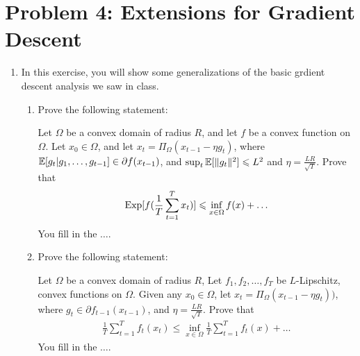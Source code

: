 \documentclass[12pt]{article}
\begin{document}
\section*{Problem 4: Extensions for Gradient Descent}
\begin{enumerate}
\item In this exercise, you will show some generalizations of the basic grdient
descent analysis we saw in class.

\begin{enumerate}
\item Prove the following statement:
\begin{proposition*} Let $\Omega$ be a convex domain of radius $R$, and let $f$ be a convex function on $\Omega$. Let $x_0 \in \Omega$, and let $x_{t} = \Pi_{\Omega}(x_{t-1} - \eta g_t )$, where $\operatorname*{\mathbb{E}}[g_t | g_1,\dots,g_{t-1}] \in \partial f(x_{t-1})$, and $\sup_{t} \operatorname*{\mathbb{E}}[\|g_t\|^2] \leqslant L^2$ and $\eta = \frac{LR}{\sqrt{T}}$.  Prove that 
\begin{eqnarray}
 \mathrm{Exp}[f(\frac{1}{T}\sum_{t=1}^T x_t)] \leqslant \inf_{x \in \Omega} f(x) + \dots
\end{eqnarray}
You fill in the $\dots$.
\end{proposition*}
\item Prove the following statement:
\begin{proposition*}  Let $\Omega$ be a convex domain of radius $R$, Let $f_1,f_2,\dots,f_T$ be $L$-Lipschitz, convex functions on $\Omega$. Given any $x_0 \in \Omega$, let $x_{t} = \Pi_{\Omega}(x_{t-1} - \eta g_t ))$, where $g_t \in \partial f_{t-1}(x_{t-1})$, and  $\eta = \frac{LR}{\sqrt{T}}$. Prove that
\begin{eqnarray}
\frac{1}{T}\sum_{t=1}^Tf_t(x_t) \le \inf_{x \in \Omega}\frac{1}{T}\sum_{t=1}^Tf_t(x) + \dots
\end{eqnarray}
You fill in the $\dots$.
\end{proposition*}
\end{enumerate}


\end{enumerate}
\end{document}
